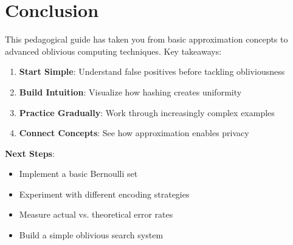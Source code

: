 \documentclass[11pt]{article}
\begin{document}
\section{Conclusion}

This pedagogical guide has taken you from basic approximation concepts to advanced oblivious computing techniques. Key takeaways:

\begin{enumerate}
    \item \textbf{Start Simple}: Understand false positives before tackling obliviousness
    \item \textbf{Build Intuition}: Visualize how hashing creates uniformity
    \item \textbf{Practice Gradually}: Work through increasingly complex examples
    \item \textbf{Connect Concepts}: See how approximation enables privacy
\end{enumerate}

\textbf{Next Steps}:
\begin{itemize}
    \item Implement a basic Bernoulli set
    \item Experiment with different encoding strategies
    \item Measure actual vs. theoretical error rates
    \item Build a simple oblivious search system
\end{itemize}
\end{document}
